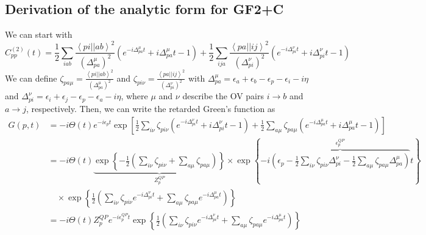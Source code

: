 \subsection{Derivation of the analytic form for GF2+C}
We can start with
\begin{equation}
    C_{pp}^{(2)}(t) = \frac{1}{2}\sum_{iab} \frac{\left< pi \left| \right| ab \right>^2}{\left(\Delta_{pa}^{\mu}\right)^2}
\left(e^{-i \Delta_{pa}^{\mu} t} +i \Delta_{pa}^{\mu} t -1 \right)
+\frac{1}{2}\sum_{ija} \frac{\left< pa \left| \right| ij \right>^2}{\left(\Delta_{pi}^{\nu}\right)^2}
\left(e^{-i \Delta_{pi}^{\nu} t} +i \Delta_{pi}^{\nu} t -1 \right)
\end{equation}
We can define $\zeta_{pa\mu} = \frac{\left< pi \left| \right| ab \right>^2}{\left(\Delta_{pa}^\mu\right)^2}$ and $\zeta_{pi\nu} = \frac{\left< pa \left| \right| ij \right>^2}{\left(\Delta_{pi}^\nu\right)^2}$ with $\Delta_{pa}^\mu = \epsilon_{a}+\epsilon_{b}-\epsilon_{p}-\epsilon_{i} - i \eta $ and $\Delta_{pi}^\nu = \epsilon_{i}+\epsilon_{j}-\epsilon_{p}-\epsilon_{a}-i\eta$, where $\mu$ and $\nu$ describe the OV pairs $i \to b$ and $a \to j$, respectively. Then, we can write the retarded Green's function as
\begin{align}
    G(p,t) &= -i \Theta(t) e^{-i \epsilon_p t} \exp \left[ \frac{1}{2}\sum_{i\nu} \zeta_{pi\nu} \left(e^{-i \Delta_{pi}^\nu t} +i \Delta_{pi}^\nu t -1 \right) +\frac{1}{2}\sum_{a\mu} \zeta_{pa\mu} \left(e^{-i \Delta_{pa}^\mu t} +i \Delta_{pa}^\mu t -1 \right) \right] \\
    &= -i \Theta(t) \underbrace{\exp \left\{-\frac{1}{2}\left( \sum_{i\nu} \zeta_{pi\nu} + \sum_{a\mu} \zeta_{pa\mu} \right)\right\}}_{Z_p^{QP}} \times \exp \left\{-i \overbrace{\left( \epsilon_p - \frac{1}{2} \sum_{i\nu} \zeta_{pi\nu} \Delta_{pi}^\nu - \frac{1}{2} \sum_{a\mu} \zeta_{pa\mu} \Delta_{pa}^\mu \right)}^{\epsilon_p^{QP}} t\right\} \\
    & \quad \times \exp \left\{ \frac{1}{2}\left(\sum_{i\nu} \zeta_{pi\nu} e^{-i \Delta_{pi}^\nu t} + \sum_{a\mu} \zeta_{pa\mu} e^{-i \Delta_{pa}^\mu t} \right) \right\} \\
&= -i \Theta(t) Z_p^{QP} e^{-i \epsilon_p^{QP} t} \exp \left\{ \frac{1}{2}\left(\sum_{i\nu} \zeta_{pi\nu} e^{-i \Delta_{pi}^\nu t} + \sum_{a\mu} \zeta_{pa\mu} e^{-i \Delta_{pa}^\mu t} \right) \right\}
\end{align}
